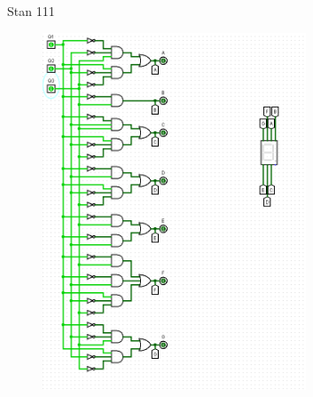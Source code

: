 \documentclass[]{article}
\begin{document}
\newpage
Stan 111
\begin{figure}[H]
	\centering
	\includegraphics[width=0.7\textwidth]{CZTERY_111.png}
\end{figure}
\end{document}
